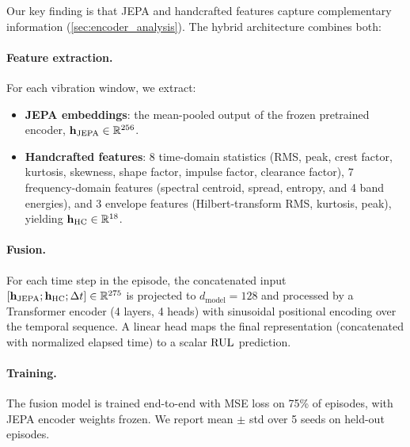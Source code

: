 Our key finding is that JEPA and handcrafted features capture complementary information (\cref{sec:encoder_analysis}). The hybrid architecture combines both:

\paragraph{Feature extraction.} For each vibration window, we extract:
\begin{itemize}[nosep]
  \item \textbf{JEPA embeddings}: the mean-pooled output of the frozen pretrained encoder, $\mathbf{h}_{\text{JEPA}} \in \mathbb{R}^{256}$.
  \item \textbf{Handcrafted features}: 8 time-domain statistics (RMS, peak, crest factor, kurtosis, skewness, shape factor, impulse factor, clearance factor), 7 frequency-domain features (spectral centroid, spread, entropy, and 4 band energies), and 3 envelope features (Hilbert-transform RMS, kurtosis, peak), yielding $\mathbf{h}_{\text{HC}} \in \mathbb{R}^{18}$.
\end{itemize}

\paragraph{Fusion.} For each time step in the episode, the concatenated input $[\mathbf{h}_{\text{JEPA}}; \mathbf{h}_{\text{HC}}; \Delta t] \in \mathbb{R}^{275}$ is projected to $d_{\text{model}} = 128$ and processed by a Transformer encoder (4 layers, 4 heads) with sinusoidal positional encoding over the temporal sequence. A linear head maps the final representation (concatenated with normalized elapsed time) to a scalar $\text{RUL}$ prediction.

\paragraph{Training.} The fusion model is trained end-to-end with MSE loss on 75\% of episodes, with JEPA encoder weights frozen. We report mean $\pm$ std over 5 seeds on held-out episodes.
